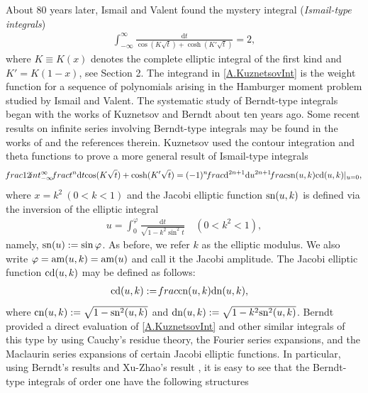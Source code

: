 \documentclass[11pt]{article}
\theoremstyle{plain}
\theoremstyle{definition}
\begin{document}
 About 80 years later, Ismail and Valent \cite{Ismail1998} found the mystery integral (\emph{Ismail-type integrals})
\begin{align}\label{A.KuznetsovInt}
	\int_{-\infty}^{\infty}{\frac{\mathrm{d}t}{\cos \left( K\sqrt{t} \right) +\cosh \left( K'\sqrt{t} \right)}=2},
\end{align}
	where $K
	\equiv K(x)$ denotes the complete elliptic integral of the first kind and $K'=K(1-x)$, see Section 2. The integrand in \eqref{A.KuznetsovInt} is the weight function for a sequence of polynomials arising in the Hamburger moment problem studied by Ismail and Valent. The systematic study of Berndt-type integrals began with the works of Kuznetsov \cite{K2017} and Berndt \cite{Berndt2016} about ten years ago. Some recent results on infinite series involving Berndt-type integrals may be found in the works of \cite{BV2024,PanWang2025,RXYZ2024,RXZ2023,XZ2023,XZ2024,ZhangRui2024} and the references therein. Kuznetsov \cite{K2017} used the contour integration and theta functions to prove a more general result of Ismail-type
integrals
\begin{align}\label{Ims-Kuz+}
\frac1{2}\int_{-\infty}^\infty \frac{t^n \mathrm{d}t}{\cos(K\sqrt{t})+\cosh(K'\sqrt{t})}=(-1)^n \frac{\mathrm{d}^{2n+1}}{\mathrm{d}u^{2n+1}} \frac{{\rm sn} (u,k)}{{\rm cd}(u,k)}|_{u=0},
\end{align}
where $x=k^2\ (0<k<1)$ and the Jacobi elliptic function ${\rm sn} (u,k)$ is defined via the inversion of the elliptic integral
\begin{align}
u=\int_0^\varphi \frac{\mathrm{d}t}{\sqrt{1-k^2\sin^2 t}}\quad (0<k^2<1),
\end{align}
namely, ${\rm sn}(u):=\sin \varphi$. As before, we refer $k$ as the elliptic modulus. We also write $\varphi={\rm am}(u,k)={\rm am}(u)$ and call it the Jacobi amplitude.
The Jacobi elliptic function ${\rm cd} (u,k)$ may be defined as follows:
\begin{align*}
& {\rm cd}(u,k):=\frac{{\rm cn}(u,k)}{{\rm dn}(u,k)},
\end{align*}
where ${\rm cn}(u,k):=\sqrt{1-{\rm sn}^2 (u,k)}$ and ${\rm dn} (u,k):=\sqrt{1-k^2{\rm sn}^2(u,k)}$. Berndt \cite{Berndt2016} provided a direct evaluation of \eqref{A.KuznetsovInt} and other similar integrals of this type by using Cauchy's residue theory, the Fourier series expansions, and the Maclaurin series expansions of certain Jacobi elliptic functions. In particular, using Berndt's results \cite{Berndt2016} and Xu-Zhao's result \cite{XZ2024}, it is easy to see that the Berndt-type integrals of order one have the following structures
\end{document}
